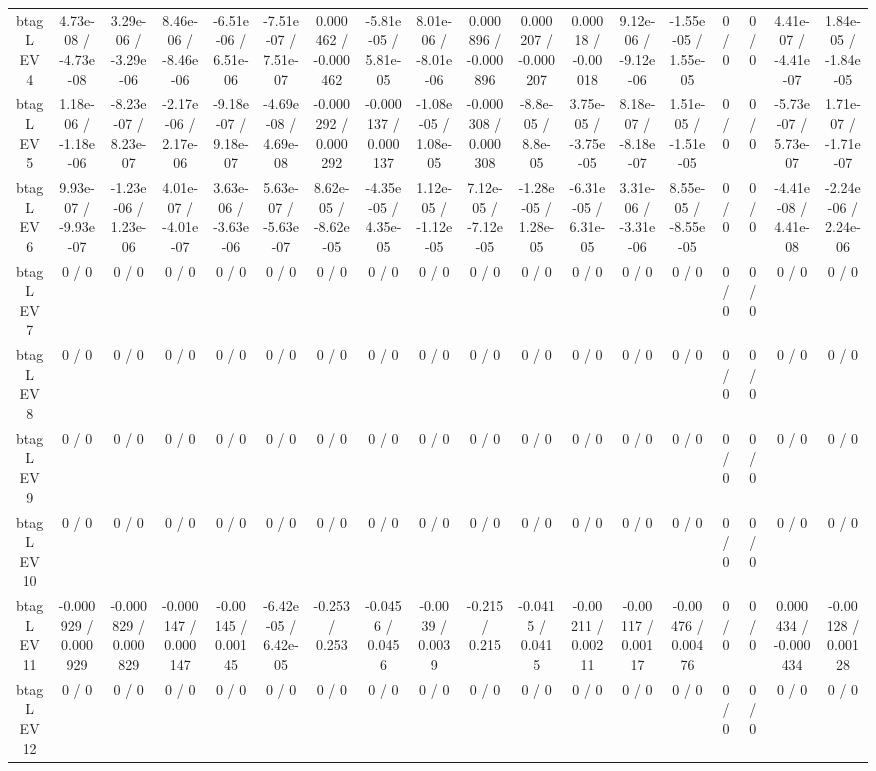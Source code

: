 \documentclass[10pt]{article}
\begin{document}
\begin{table}[htbp]
\begin{center}
\begin{tabular}{|c|c|c|c|c|c|c|c|c|c|c|c|c|c|c|c|c|c|}
  btag L EV 4 & 4.73e-08 / -4.73e-08 & 3.29e-06 / -3.29e-06 & 8.46e-06 / -8.46e-06 & -6.51e-06 / 6.51e-06 & -7.51e-07 / 7.51e-07 & 0.000462 / -0.000462 & -5.81e-05 / 5.81e-05 & 8.01e-06 / -8.01e-06 & 0.000896 / -0.000896 & 0.000207 / -0.000207 & 0.00018 / -0.00018 & 9.12e-06 / -9.12e-06 & -1.55e-05 / 1.55e-05 & 0 / 0 & 0 / 0 & 4.41e-07 / -4.41e-07 & 1.84e-05 / -1.84e-05 \\ 
  btag L EV 5 & 1.18e-06 / -1.18e-06 & -8.23e-07 / 8.23e-07 & -2.17e-06 / 2.17e-06 & -9.18e-07 / 9.18e-07 & -4.69e-08 / 4.69e-08 & -0.000292 / 0.000292 & -0.000137 / 0.000137 & -1.08e-05 / 1.08e-05 & -0.000308 / 0.000308 & -8.8e-05 / 8.8e-05 & 3.75e-05 / -3.75e-05 & 8.18e-07 / -8.18e-07 & 1.51e-05 / -1.51e-05 & 0 / 0 & 0 / 0 & -5.73e-07 / 5.73e-07 & 1.71e-07 / -1.71e-07 \\ 
  btag L EV 6 & 9.93e-07 / -9.93e-07 & -1.23e-06 / 1.23e-06 & 4.01e-07 / -4.01e-07 & 3.63e-06 / -3.63e-06 & 5.63e-07 / -5.63e-07 & 8.62e-05 / -8.62e-05 & -4.35e-05 / 4.35e-05 & 1.12e-05 / -1.12e-05 & 7.12e-05 / -7.12e-05 & -1.28e-05 / 1.28e-05 & -6.31e-05 / 6.31e-05 & 3.31e-06 / -3.31e-06 & 8.55e-05 / -8.55e-05 & 0 / 0 & 0 / 0 & -4.41e-08 / 4.41e-08 & -2.24e-06 / 2.24e-06 \\ 
  btag L EV 7 & 0 / 0 & 0 / 0 & 0 / 0 & 0 / 0 & 0 / 0 & 0 / 0 & 0 / 0 & 0 / 0 & 0 / 0 & 0 / 0 & 0 / 0 & 0 / 0 & 0 / 0 & 0 / 0 & 0 / 0 & 0 / 0 & 0 / 0 \\ 
  btag L EV 8 & 0 / 0 & 0 / 0 & 0 / 0 & 0 / 0 & 0 / 0 & 0 / 0 & 0 / 0 & 0 / 0 & 0 / 0 & 0 / 0 & 0 / 0 & 0 / 0 & 0 / 0 & 0 / 0 & 0 / 0 & 0 / 0 & 0 / 0 \\ 
  btag L EV 9 & 0 / 0 & 0 / 0 & 0 / 0 & 0 / 0 & 0 / 0 & 0 / 0 & 0 / 0 & 0 / 0 & 0 / 0 & 0 / 0 & 0 / 0 & 0 / 0 & 0 / 0 & 0 / 0 & 0 / 0 & 0 / 0 & 0 / 0 \\ 
  btag L EV 10 & 0 / 0 & 0 / 0 & 0 / 0 & 0 / 0 & 0 / 0 & 0 / 0 & 0 / 0 & 0 / 0 & 0 / 0 & 0 / 0 & 0 / 0 & 0 / 0 & 0 / 0 & 0 / 0 & 0 / 0 & 0 / 0 & 0 / 0 \\ 
  btag L EV 11 & -0.000929 / 0.000929 & -0.000829 / 0.000829 & -0.000147 / 0.000147 & -0.00145 / 0.00145 & -6.42e-05 / 6.42e-05 & -0.253 / 0.253 & -0.0456 / 0.0456 & -0.0039 / 0.0039 & -0.215 / 0.215 & -0.0415 / 0.0415 & -0.00211 / 0.00211 & -0.00117 / 0.00117 & -0.00476 / 0.00476 & 0 / 0 & 0 / 0 & 0.000434 / -0.000434 & -0.00128 / 0.00128 \\ 
  btag L EV 12 & 0 / 0 & 0 / 0 & 0 / 0 & 0 / 0 & 0 / 0 & 0 / 0 & 0 / 0 & 0 / 0 & 0 / 0 & 0 / 0 & 0 / 0 & 0 / 0 & 0 / 0 & 0 / 0 & 0 / 0 & 0 / 0 & 0 / 0 \\ 

\end{tabular}
\end{center}
\end{table}
\end{document}
